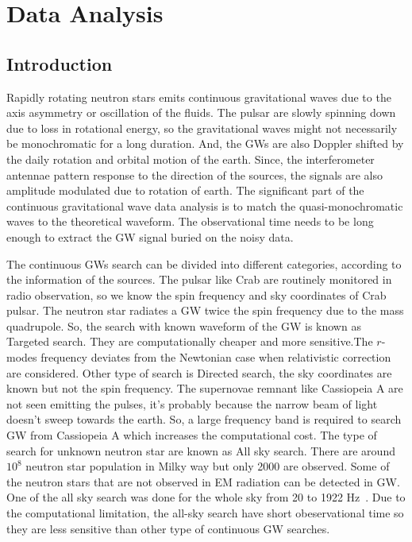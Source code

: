 \documentclass{ttuthes2007}
\begin{document}

\chapter{\textbf{Data Analysis}}
\section{Introduction}
Rapidly rotating neutron stars emits continuous gravitational waves due to the
axis asymmetry or oscillation of the fluids. The pulsar are slowly spinning down
due to loss in rotational energy, so the gravitational waves might not
necessarily be monochromatic for a long duration. And, the \acp{GW} are also
Doppler shifted by the daily rotation and orbital motion of the earth. Since,
the interferometer antennae pattern response to the direction of the sources,
the signals are also amplitude modulated due to rotation of earth. The
significant part of the continuous gravitational wave data analysis is to match
the quasi-monochromatic waves to the theoretical waveform. The observational
time needs to be long enough  to extract the \ac{GW} signal buried on
the noisy data. 

The continuous \acp{GW} search can be divided into different categories,
according to the information of the sources. The pulsar like Crab are routinely
monitored in radio observation, so we know the spin frequency and sky
coordinates of Crab pulsar. The neutron star radiates a \ac{GW} twice the spin
frequency due to the mass quadrupole. So, the search with known waveform of the
\ac{GW} is known as Targeted search. They are computationally cheaper and more
sensitive.The $r$-modes frequency deviates from the Newtonian case when
relativistic correction are considered. 
Other type of search is Directed search, the sky coordinates are known but not
the spin frequency. The supernovae remnant like Cassiopeia A are not seen
emitting the pulses, it's probably because the narrow beam of light doesn't
sweep towards the earth. So, a large frequency band is required to search
\ac{GW} from Cassiopeia A which increases the computational cost. The type of
search for unknown neutron star are known as All sky search. There are around
$10^8$ neutron star population in Milky way but only 2000 are observed. Some of
the neutron stars that are not observed in \ac{EM} radiation can be detected in
\ac{GW}.  One of the all sky
search was done for the whole sky from 20 to 1922 Hz~\cite{Abbott_2019a}. Due to
the computational limitation, the all-sky search have short obeservational time
so they are less sensitive than other type of continuous \ac{GW} searches.
\end{document}
